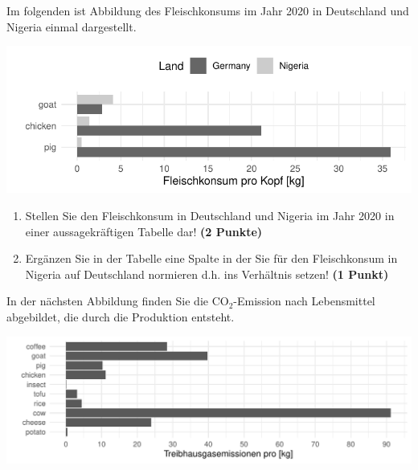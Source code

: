\documentclass[a4paper, 10pt]{scrartcl}\usepackage[]{graphicx}\usepackage[]{xcolor}
\makeatletter
\def\maxwidth{ %
  \ifdim\Gin@nat@width>\linewidth
    \linewidth
  \else
    \Gin@nat@width
  \fi
}
\newenvironment{knitrout}{}{} %
\makeatother
\begin{document}
Im folgenden ist Abbildung des Fleischkonsums im Jahr 2020 in
Deutschland und Nigeria einmal dargestellt. 

\begin{knitrout}
\color{fgcolor}

{\centering \includegraphics[width=\maxwidth]{img/math-14-a-1} 

}


\end{knitrout}
  
\begin{enumerate}
\item Stellen Sie den Fleischkonsum in Deutschland und Nigeria im Jahr
  2020 in einer aussagekr{\"a}ftigen Tabelle dar! 
  \textbf{(2 Punkte)}
\item Erg{\"a}nzen Sie in der Tabelle eine Spalte in der Sie f{\"u}r den
  Fleischkonsum in Nigeria auf Deutschland normieren d.h. ins Verh{\"a}ltnis
  setzen! \textbf{(1 Punkt)}
\end{enumerate}

In der n{\"a}chsten Abbildung finden Sie die CO$_2$-Emission nach Lebensmittel
abgebildet, die durch die Produktion entsteht.

\begin{knitrout}
\color{fgcolor}

{\centering \includegraphics[width=\maxwidth]{img/math-14-b-1} 

}


\end{knitrout}
\end{document}
